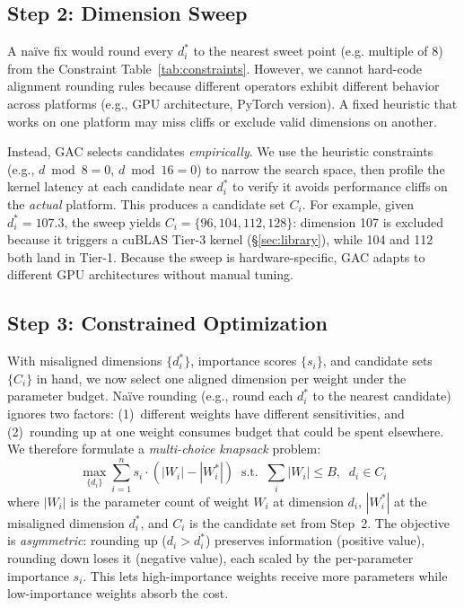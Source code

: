 \documentclass[sigplan,10pt]{acmart}
\begin{document}
\subsection{Step 2: Dimension Sweep}
\label{sec:step2}

A na\"ive fix would round every $d_i^*$ to the nearest sweet point (e.g. multiple of 8) from the Constraint Table~\ref{tab:constraints}.
However, we cannot hard-code alignment rounding rules because different operators exhibit different behavior across platforms (e.g., GPU architecture, PyTorch version).
A fixed heuristic that works on one platform may miss cliffs or exclude valid dimensions on another.

Instead, GAC selects candidates \emph{empirically}.
We use the heuristic constraints (e.g., $d \bmod 8 = 0$, $d \bmod 16 = 0$) to narrow the search space, then profile the kernel latency at each candidate near $d_i^*$ to verify it avoids performance cliffs on the \emph{actual} platform.
This produces a candidate set $C_i$.
For example, given $d_i^*{=}107.3$, the sweep yields $C_i{=}\{96, 104, 112, 128\}$: dimension 107 is excluded because it triggers a cuBLAS Tier-3 kernel (\S\ref{sec:library}), while 104 and 112 both land in Tier-1.
Because the sweep is hardware-specific, GAC adapts to different GPU architectures without manual tuning.

\subsection{Step 3: Constrained Optimization}
\label{sec:step3}

With misaligned dimensions $\{d_i^*\}$, importance scores $\{s_i\}$, and candidate sets $\{C_i\}$ in hand, we now select one aligned dimension per weight under the parameter budget.
Na\"ive rounding (e.g., round each $d_i^*$ to the nearest candidate) ignores two factors: (1)~different weights have different sensitivities, and (2)~rounding up at one weight consumes budget that could be spent elsewhere.
We therefore formulate a \emph{multi-choice knapsack} problem:
\begin{equation}
\max_{\{d_i\}} \sum_{i=1}^{n} s_i \cdot (|W_i| - |W_i^*|) \;\;\text{s.t.}\;\; \sum_{i} |W_i| \leq B,\;\; d_i \in C_i
\label{eq:gac}
\end{equation}
where $|W_i|$ is the parameter count of weight $W_i$ at dimension $d_i$, $|W_i^*|$ at the misaligned dimension $d_i^*$, and $C_i$ is the candidate set from Step~2.
The objective is \emph{asymmetric}: rounding up ($d_i > d_i^*$) preserves information (positive value), rounding down loses it (negative value), each scaled by the per-parameter importance $s_i$.
This lets high-importance weights receive more parameters while low-importance weights absorb the cost.
\end{document}
